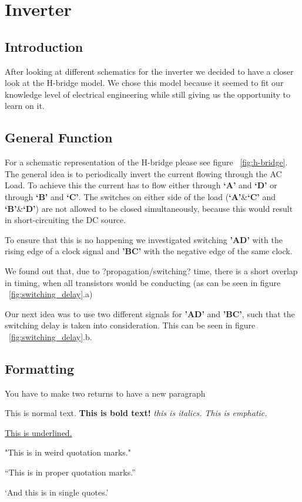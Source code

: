 \chapter{Inverter}\label{ch:inverter}
\section{Introduction}
After looking at different schematics for the inverter we decided to have a closer look at the H-bridge model.
We chose this model because it seemed to fit our knowledge level of electrical engineering while still giving us the opportunity to learn on it.

\section{General Function}
For a schematic representation of the H-bridge please see figure ~\ref{fig:h-bridge}.
The general idea is to periodically invert the current flowing through the AC Load.
To achieve this the current has to flow either through \textbf{`A'} and \textbf{`D'} or through \textbf{`B'} and \textbf{`C'}.
\hfill
{}\label{fig:h-bridge}
\newpage 
The switches on either side of the load (\textbf{`A'}\&\textbf{`C'} and \textbf{`B'}\&\textbf{`D'}) are not allowed to be closed simultaneously, because this would result in short-circuiting the DC source.

To ensure that this is no happening we investigated switching \textbf{'AD'} with the rising edge of a clock signal and \textbf{'BC'} with the negative edge of the same clock.

We found out that, due to ?propagation/switching? time, there is a short overlap in timing, when all transistors would be conducting (as can be seen in figure ~\ref{fig:switching_delay}.a)

\label{fig:switching_delay}

Our next idea was to use two different signals for \textbf{'AD'} and \textbf{'BC'}, such that the switching delay is taken into consideration. This can be seen in figure ~\ref{fig:switching_delay}.b.

\section{Formatting}
You have to make two returns to have a new paragraph

This is normal text. \textbf{This is bold text!}
\textit{this is italics.}
\emph{This is emphatic.}

\underline{This is underlined.}

"This is in weird quotation marks."

``This is in proper quotation marks.''

`And this is in single quotes.'
